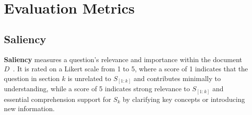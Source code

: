 
\section{Evaluation Metrics}


\subsection{Saliency}
\label{appendix:saliency}
\textbf{Saliency} measures a question’s relevance and importance within the document \( D \)~\cite{wu2024questions}.
It is rated on a Likert scale from 1 to 5, where a score of 1 indicates that the question in section \( k \) is unrelated to \( S_{[1:k]} \) and contributes minimally to understanding, while a score of 5 indicates strong relevance to \( S_{[1:k]} \) and essential comprehension support for \( S_k \) by clarifying key concepts or introducing new information.

